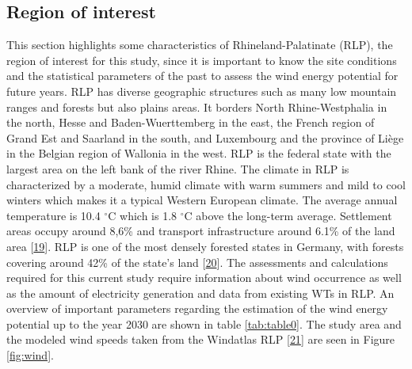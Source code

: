 \documentclass[a4paper,11pt]{article}
\begin{document}
\hypertarget{region-of-interest}{%
\subsection{Region of interest}\label{region-of-interest}}

This section highlights some characteristics of Rhineland-Palatinate (RLP), the region of interest for this study, since it is important to know the site conditions and the statistical parameters of the past to assess the wind energy potential for future years. RLP has diverse geographic structures such as many low mountain ranges and forests but also plains areas. It borders North Rhine-Westphalia in the north, Hesse and Baden-Wuerttemberg in the east, the French region of Grand Est and Saarland in the south, and Luxembourg and the province of Liège in the Belgian region of Wallonia in the west. RLP is the federal state with the largest area on the left bank of the river Rhine. The climate in RLP is characterized by a moderate, humid climate with warm summers and mild to cool winters which makes it a typical Western European climate. The average annual temperature is 10.4 \(^\circ\)C which is 1.8 \(^\circ\)C above the long-term average. Settlement areas occupy around 8,6\% and transport infrastructure around 6.1\% of the land area {[}\protect\hyperlink{ref-StateStatisticalOfficeofRhinelandPalatinate.2020}{19}{]}. RLP is one of the most densely forested states in Germany, with forests covering around 42\% of the state's land {[}\protect\hyperlink{ref-HansenandLamour.2021}{20}{]}. The assessments and calculations required for this current study require information about wind occurrence as well as the amount of electricity generation and data from existing WTs in RLP. An overview of important parameters regarding the estimation of the wind energy potential up to the year 2030 are shown in table \ref{tab:table0}. The study area and the modeled wind speeds taken from the Windatlas RLP {[}\protect\hyperlink{ref-MinisteriumfurWirtschaftKlimaschutzEnergieundLandesplanung.2013}{21}{]} are seen in Figure \ref{fig:wind}.
\end{document}
